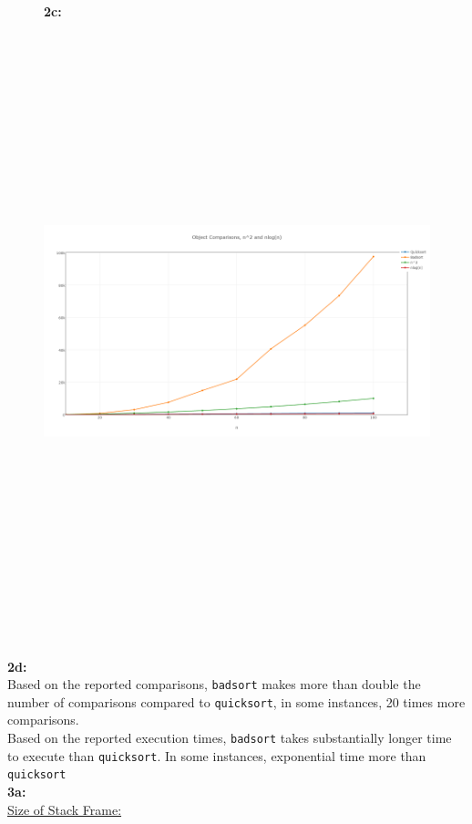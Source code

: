 \documentclass[12pt]{article}
\begin{document}
\begin{figure}
	\textbf{2c:}
\includegraphics[scale=1.1,width=25cm,height=18cm,angle=90]{newplot.png}
\centering
\end{figure}

\pagebreak

\textbf{2d:}\\
Based on the reported comparisons, \texttt{badsort} makes more than double the number of comparisons compared to \texttt{quicksort}, in some instances, 20 times more comparisons.\\

Based on the reported execution times, \texttt{badsort} takes substantially longer time to execute than \texttt{quicksort}. In some instances, exponential time more than \texttt{quicksort}\\

\textbf{3a:}\\

\underline{Size of Stack Frame:}\\
\end{document}
